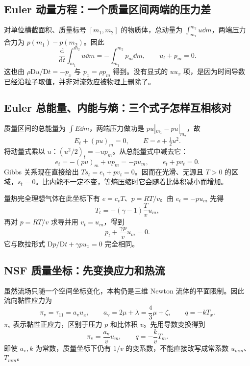 \subsection{Euler 动量方程：一个质量区间两端的压力差}

对单位横截面积、质量标号 $[m_1,m_2]$ 的物质体，总动量为 $\int_{m_1}^{m_2}u\dd m$，两端压力合力为 $p(m_1)-p(m_2)$。因此
\begin{equation}
 \frac{\mathrm d}{\mathrm dt}\int_{m_1}^{m_2}u\dd m
 =-\int_{m_1}^{m_2}p_m\dd m,
 \qquad\boxed{u_t+p_m=0.}\label{eq:lag-momentum}
\end{equation}
这也由 $\rho\mathrm Du/\mathrm Dt=-p_x$ 与 $p_x=\rho p_m$ 得到。没有显式的 $uu_x$ 项，是因为时间导数已经沿粒子取值，并非对流效应被物理上删除了。

\subsection{Euler 总能量、内能与熵：三个式子怎样互相核对}

质量区间的总能量为 $\int E\dd m$，两端压力做功是 $p u|_{m_1}-p u|_{m_2}$，故
\begin{equation}
 \boxed{E_t+(pu)_m=0,\qquad E=e+\tfrac12u^2.}\label{eq:lag-energy}
\end{equation}
将动量式乘以 $u$：$(u^2/2)_t=-up_m$。从总能量式中减去它：
\begin{equation}
 e_t=-(pu)_m+up_m=-p u_m,
 \qquad \boxed{e_t+p v_t=0.}\label{eq:lag-internal}
\end{equation}
Gibbs 关系现在直接给出 $T s_t=e_t+p v_t=0$。因而在光滑、无源且 $T>0$ 的区域，$s_t=0$。比内能不一定不变，等熵压缩时它会随着比体积减小而增加。

量热完全理想气体在此坐标下有 $e=c_vT$、$p=RT/v$。由 $e_t=-pu_m$ 先得
\begin{equation}
 T_t=-(\gamma-1)\frac T v u_m,
\end{equation}
再对 $p=RT/v$ 求导并用 $v_t=u_m$，得到
\begin{equation}
 p_t+\frac{\gamma p}{v}u_m=0.
\end{equation}
它与欧拉形式 $\mathrm Dp/\mathrm Dt+\gamma p u_x=0$ 完全相同。

\subsection{NSF 质量坐标：先变换应力和热流}

虽然流场只随一个空间坐标变化，本构仍是三维 Newton 流体的平面限制。因此流向黏性应力为
\begin{equation}
 \pi_{\mathrm v}=\tau_{11}=a_{\mathrm v}u_x,
 \qquad a_{\mathrm v}=2\mu+\lambda=\frac43\mu+\zeta,
 \qquad q=-kT_x.
\end{equation}
$\pi_{\mathrm v}$ 表示黏性正应力，区别于压力 $p$ 和比体积 $v$。先用导数变换得到
\begin{equation}
 \boxed{\pi_{\mathrm v}=\frac{a_{\mathrm v}}v u_m,
 \qquad q=-\frac{k}{v}T_m.}\label{eq:lag-viscous-fluxes}
\end{equation}
即使 $a_{\mathrm v},k$ 为常数，质量坐标下仍有 $1/v$ 的变系数，不能直接改写成常系数 $u_{mm}$、$T_{mm}$。

